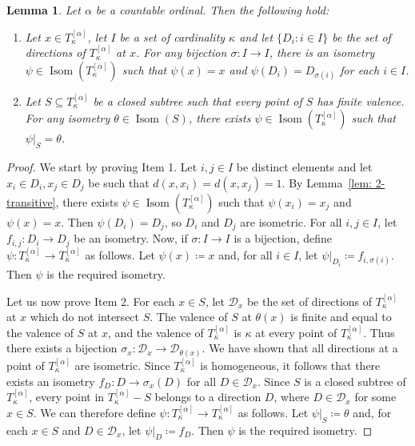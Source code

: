 \documentclass[11pt]{article}
\DeclareMathOperator{\Isom}{Isom}
\newtheorem{lemma}[theorem]{Lemma}
\theoremstyle{definition}
\theoremstyle{remark}
\begin{document}
\begin{lemma} \label{lem: very highly transitive}
	Let $\alpha$ be a countable ordinal. Then the following hold:
	\begin{enumerate}
		\item Let $x \in T_\kappa^{[\alpha]}$, let $I$ be a set of cardinality $\kappa$ and let $\{D_i : i \in I\}$ be the set of directions of $T_\kappa^{[\alpha]}$ at $x$. For any bijection $\sigma: I \rightarrow I$, there is an isometry $\psi \in \Isom(T_\kappa^{[\alpha]})$ such that $\psi(x) = x$ and $\psi(D_i) = D_{\sigma(i)}$ for each $i \in I$.
		\item Let $S \subseteq T_\kappa^{[\alpha]}$ be a closed subtree such that every point of $S$ has finite valence. For any isometry $\theta \in \Isom(S)$, there exists $\psi \in \Isom(T_\kappa^{[\alpha]})$ such that $\psi|_{S} = \theta$.
	\end{enumerate}
\end{lemma}
\begin{proof}
	We start by proving Item 1. Let $i,j \in I$ be distinct elements and let $x_i \in D_i, x_j \in D_j$ be such that $d(x,x_i) = d(x,x_j) = 1$. By Lemma~\ref{lem: 2-transitive}, there exists $\psi \in \Isom(T_\kappa^{[\alpha]})$ such that $\psi(x_i) = x_j$ and $\psi(x) = x$. Then $\psi(D_i) = D_j$, so $D_i$ and $D_j$ are isometric. For all $i,j \in I$, let $f_{i,j}: D_i \rightarrow D_j$ be an isometry. Now, if $\sigma: I \rightarrow I$ is a bijection, define $\psi: T_\kappa^{[\alpha]} \rightarrow T_\kappa^{[\alpha]}$ as follows. Let $\psi(x) \coloneqq x$ and, for all $i \in I$, let $\psi|_{D_i} \coloneqq f_{i,\sigma(i)}$. Then $\psi$ is the required isometry.
	
	Let us now prove Item 2. For each $x \in S$, let $\mathcal{D}_x$ be the set of directions of $T_\kappa^{[\alpha]}$ at $x$ which do not intersect $S$. The valence of $S$ at $\theta(x)$ is finite and equal to the valence of $S$ at $x$, and the valence of $T_\kappa^{[\alpha]}$ is $\kappa$ at every point of $T_\kappa^{[\alpha]}$. Thus there exists a bijection $\sigma_x : \mathcal{D}_x \rightarrow \mathcal{D}_{\theta(x)}$. We have shown that all directions at a point of $T_\kappa^{[\alpha]}$ are isometric. Since $T_\kappa^{[\alpha]}$ is homogeneous, it follows that there exists an isometry $f_D: D \rightarrow \sigma_x(D)$ for all $D \in \mathcal{D}_x$. Since $S$ is a closed subtree of $T_\kappa^{[\alpha]}$, every point in $T_\kappa^{[\alpha]} - S$ belongs to a direction $D$, where $D \in \mathcal{D}_x$ for some $x \in S$.
	We can therefore define $\psi:T_\kappa^{[\alpha]} \rightarrow T_\kappa^{[\alpha]}$ as follows. Let $\psi|_{S} \coloneqq \theta$ and, for each $x \in S$ and $D \in \mathcal{D}_x$, let $\psi|_{D} \coloneqq f_D$. Then $\psi$ is the required isometry.
\end{proof}
\end{document}
